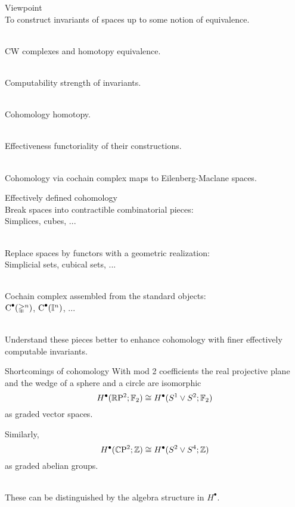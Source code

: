 
\begin{frame}{Viewpoint}
	\pause
	 \\
	To construct invariants of spaces up to some notion of equivalence.

	\bigskip\pause
	 \\
	CW complexes and homotopy equivalence.

	\bigskip\pause
	 \\
	Computability  strength of invariants.

	\bigskip\pause
	 \\
	Cohomology  homotopy.

	\bigskip\pause
	 \\
	Effectiveness  functoriality of their constructions.

	\bigskip\pause
	 \\
	Cohomology via cochain complex  maps to Eilenberg-Maclane spaces.
\end{frame}

\begin{frame}{Effectively defined cohomology}
	\pause
	 \\
	Break spaces into contractible combinatorial pieces: \\
	Simplices, cubes, ...

	\bigskip\pause
	 \\
	Replace spaces by functors with a geometric realization: \\
	Simplicial sets, cubical sets, ...

	\bigskip\pause
	 \\
	Cochain complex assembled from the standard objects: \\
	$\operatorname{C}^\bullet(\mathbb{\Delta}^n)$, $\operatorname{C}^\bullet(\mathbb{I}^n)$, ...

	\bigskip\pause
	 \\
	Understand these pieces better to enhance cohomology with finer effectively computable invariants.
\end{frame}

\begin{frame}{Shortcomings of cohomology}
	\pause With mod 2 coefficients the real projective plane and the wedge of a sphere and a circle are isomorphic
	\[
	H^\bullet(\mathbb{R} \mathrm{P}^2; {\mathbb{F}_2}) \cong H^\bullet(S^1 \vee S^2; {\mathbb{F}_2})
	\]
	as graded vector spaces.

	\bigskip\pause
	Similarly,
	\[
	H^\bullet(\mathbb{C} \mathrm{P}^2; \mathbb{Z}) \cong H^\bullet(S^2 \vee S^4; \mathbb{Z})
	\]
	as graded abelian groups.

	\bigskip\pause
	 \\
	These can be distinguished by the algebra structure in $H^\bullet$.
\end{frame}